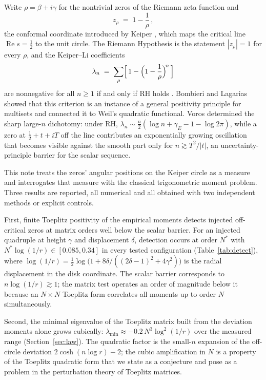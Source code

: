 \documentclass[11pt,oneside]{article}
\theoremstyle{remark}
\newcommand{\re}{\operatorname{Re}}
\begin{document}
Write $\rho = \beta + i\gamma$ for the nontrivial zeros of the Riemann zeta
function and
\begin{equation}\label{eq:keiper}
z_\rho \;=\; 1 - \frac{1}{\rho}\,,
\end{equation}
the conformal coordinate introduced by Keiper \cite{Keiper}, which maps the
critical line $\re s = \tfrac12$ to the unit circle. The Riemann Hypothesis is
the statement $|z_\rho| = 1$ for every $\rho$, and the Keiper--Li coefficients
\begin{equation}\label{eq:li}
\lambda_n \;=\; \sum_\rho \Bigl[\,1 - \Bigl(1 - \frac1\rho\Bigr)^{\!n}\,\Bigr]
\end{equation}
are nonnegative for all $n \ge 1$ if and only if RH holds \cite{Li}. Bombieri
and Lagarias \cite{BL} showed that this criterion is an instance of a general
positivity principle for multisets and connected it to Weil's quadratic
functional. Voros \cite{VorosSharp,VorosBook,VorosDisc} determined the sharp
large-$n$ dichotomy: under RH,
$\lambda_n \sim \tfrac n2(\log n + \gamma_E - 1 - \log 2\pi)$, while a zero at
$\tfrac12 + t + iT$ off the line contributes an exponentially growing
oscillation that becomes visible against the smooth part only for
$n \gtrsim T^2/|t|$, an uncertainty-principle barrier for the scalar sequence.

This note treats the zeros' angular positions on the Keiper circle as a measure
and interrogates that measure with the classical trigonometric moment problem.
Three results are reported, all numerical and all obtained with two independent
methods or explicit controls.

First, finite Toeplitz positivity of the empirical moments detects injected
off-critical zeros at matrix orders well below the scalar barrier. For an
injected quadruple at height $\gamma$ and displacement $\delta$, detection
occurs at order $N^{*}$ with $N^{*}\log(1/r) \in [0.085, 0.34]$ in every tested
configuration (Table~\ref{tab:detect}), where
$\log(1/r) = \tfrac12\log\bigl(1 + 8\delta/((2\delta-1)^2 + 4\gamma^2)\bigr)$ is
the radial displacement in the disk coordinate. The scalar barrier corresponds
to $n\log(1/r) \gtrsim 1$; the matrix test operates an order of magnitude below
it because an $N \times N$ Toeplitz form correlates all moments up to order $N$
simultaneously.

Second, the minimal eigenvalue of the Toeplitz matrix built from the deviation
moments alone grows cubically: $\lambda_{\min} \approx -0.2\,N^3 \log^2(1/r)$
over the measured range (Section~\ref{sec:law}). The quadratic factor is the
small-$n$ expansion of the off-circle deviation
$2\cosh(n\log r) - 2$; the cubic amplification in $N$ is a property of the
Toeplitz quadratic form that we state as a conjecture and pose as a problem in
the perturbation theory of Toeplitz matrices.
\end{document}

